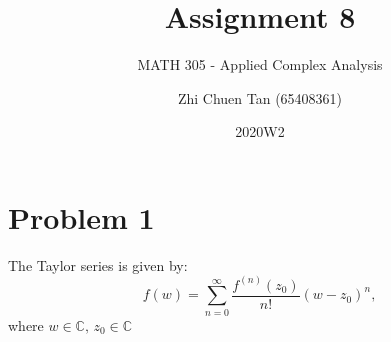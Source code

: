 \documentclass[letterpaper, titlepage, DIV=14]{scrartcl}
\title{Assignment 8}
\subtitle{MATH 305 - Applied Complex Analysis}
\author{Zhi Chuen Tan (65408361)}
\date{2020W2}
\begin{document}
    \onehalfspacing
    \hypersetup{pageanchor=false}
    \begin{titlepage}
        \maketitle
        \vfill
        
    \end{titlepage}
    \hypersetup{pageanchor=true}

    \section*{Problem 1}
    The Taylor series is given by:
    \begin{equation*}
      f(w) = \sum_{n=0}^{\infty}\frac{f^{(n)}(z_{0})}{n!}(w-z_{0})^{n},
    \end{equation*} where $w \in \mathbb{C}, \, z_{0} \in \mathbb{C}$
\end{document}
